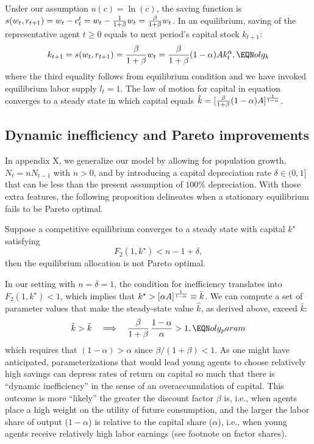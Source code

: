 Under our assumption $u(c)=\ln(c)$, the saving function is
$ s( w_t,  r_{t+1}) = 
 w_t - c^t_t= w_t - {1 \over 1+\beta} w_t
= {\beta \over 1+\beta} w_t$.
In an equilibrium, saving of the representative agent
$t\geq 0$  equals to next period's capital stock $k_{t+1}$:
$$k_{t+1} =  s( w_t,  r_{t+1})
            = {\beta \over 1+\beta} w_t
            = {\beta \over 1+\beta} (1-\alpha)A k^{\alpha}_t,
                                                    \EQN olg_k
$$
where the third equality follows from equilibrium
condition  and we have invoked equilibrium
labor supply $l_t=1$. The law of motion for capital in
equation  converges to a steady state in 
which capital equals 
$\hat k = [{\beta \over 1+\beta} (1-\alpha)A]^{1 \over 1-\alpha}$. 


\subsection{Dynamic inefficiency and Pareto 
                               improvements}\label{sec:dynineff}%
In appendix X, we generalize our model by 
allowing for population growth, $N_t=n N_{t-1}$ with $n>0$, and 
by introducing a capital depreciation rate $\delta\in (0,1]$ 
that can be less than the present assumption of $100\%$ 
depreciation. With those extra features, the following 
proposition delineates when a stationary equilibrium
fails to be Pareto optimal.

\medskip
{}  Suppose a competitive equilibrium converges
to a steady state with capital $k^\star$ satisfying
$$ F_2(1,k^\star) < n-1 +\delta,
$$
then the equilibrium allocation is not Pareto optimal.

\medskip


\noindent
In our setting with $n=\delta=1$, the condition for 
inefficiency translates into 
$F_2(1, k^\star)< 1$, which implies that 
$k^\star>[\alpha A]^{1 \over 1-\alpha} \equiv \bar k$.
We can compute a set of parameter values that make
the steady-state value $\hat k$, as derived above, exceed $\bar k$:
$$ \hat k > \bar k \quad \Longrightarrow \quad 
   {\beta \over 1+\beta} \, {1-\alpha \over \alpha} > 1, \EQN olg_param
$$
which requires that $(1-\alpha)>\alpha$ since
$\beta/(1+\beta)<1$. As one might have anticipated, 
parameterizations that would
lead young agents to choose relatively high savings 
can depress rates of return on capital so much that there
is ``dynamic inefficiency'' in the sense of an overaccumulation of capital. 
This outcome is more ``likely'' the
greater the discount factor $\beta$ is, i.e., when agents 
place a high weight on the utility of future consumption,
and the larger the labor share of output ($1-\alpha$) is 
relative to the capital share ($\alpha$), i.e., when young 
agents receive relatively high labor earnings 
(see footnote  on factor
shares).

